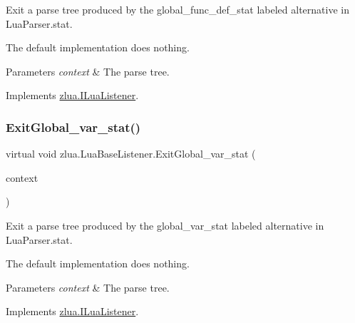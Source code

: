 Exit a parse tree produced by the {\ttfamily global\+\_\+func\+\_\+def\+\_\+stat} labeled alternative in Lua\+Parser.\+stat. 

The default implementation does nothing.


\begin{DoxyParams}{Parameters}
{\em context} & The parse tree.\\
\hline
\end{DoxyParams}


Implements \mbox{\hyperlink{interfacezlua_1_1_i_lua_listener_a13e62813408bab9b10861e768a3c5ca1}{zlua.\+I\+Lua\+Listener}}.

\mbox{\label{classzlua_1_1_lua_base_listener_a918c1a931ec0803f8ce782d404d9e2c4}} 
\subsubsection{\texorpdfstring{Exit\+Global\+\_\+var\+\_\+stat()}{ExitGlobal\_var\_stat()}}
{\footnotesize\ttfamily virtual void zlua.\+Lua\+Base\+Listener.\+Exit\+Global\+\_\+var\+\_\+stat (\begin{DoxyParamCaption}\item[{\mbox{[}\+Not\+Null\mbox{]} \mbox{\hyperlink{classzlua_1_1_lua_parser_1_1_global__var__stat_context}{Lua\+Parser.\+Global\+\_\+var\+\_\+stat\+Context}}}]{context }\end{DoxyParamCaption})\hspace{0.3cm}{\ttfamily [virtual]}}



Exit a parse tree produced by the {\ttfamily global\+\_\+var\+\_\+stat} labeled alternative in Lua\+Parser.\+stat. 

The default implementation does nothing.


\begin{DoxyParams}{Parameters}
{\em context} & The parse tree.\\
\hline
\end{DoxyParams}


Implements \mbox{\hyperlink{interfacezlua_1_1_i_lua_listener_a4e14ac8afc7b39056fc78c89ac3ba8fa}{zlua.\+I\+Lua\+Listener}}.

